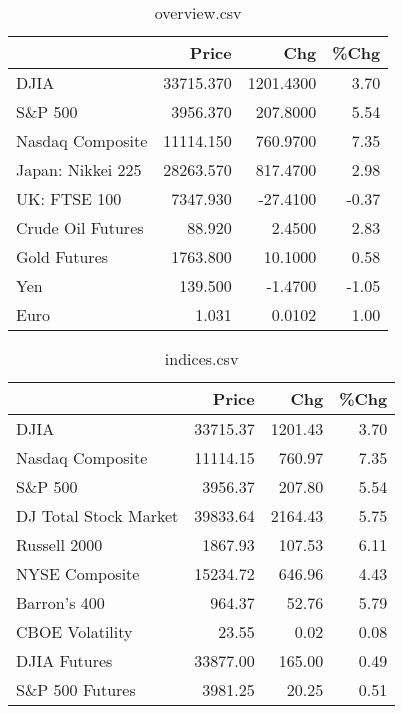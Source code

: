 \documentclass{article}%
\begin{document}
\begin{table}[htbp]%
\caption{overview.csv}%
\centering%
\begin{adjustbox}{width=1\textwidth}%
\begin{tabular}{lrrr}
\toprule
                  &     Price &       Chg &  \%Chg \\
\midrule
             DJIA & 33715.370 & 1201.4300 &  3.70 \\
          S\&P 500 &  3956.370 &  207.8000 &  5.54 \\
 Nasdaq Composite & 11114.150 &  760.9700 &  7.35 \\
Japan: Nikkei 225 & 28263.570 &  817.4700 &  2.98 \\
     UK: FTSE 100 &  7347.930 &  -27.4100 & -0.37 \\
Crude Oil Futures &    88.920 &    2.4500 &  2.83 \\
     Gold Futures &  1763.800 &   10.1000 &  0.58 \\
              Yen &   139.500 &   -1.4700 & -1.05 \\
             Euro &     1.031 &    0.0102 &  1.00 \\
\bottomrule
\end{tabular}
%
\end{adjustbox}%
\end{table}

%


\begin{table}[htbp]%
\caption{indices.csv}%
\centering%
\begin{adjustbox}{width=1\textwidth}%
\begin{tabular}{lrrr}
\toprule
                      &    Price &     Chg &  \%Chg \\
\midrule
                 DJIA & 33715.37 & 1201.43 &  3.70 \\
     Nasdaq Composite & 11114.15 &  760.97 &  7.35 \\
              S\&P 500 &  3956.37 &  207.80 &  5.54 \\
DJ Total Stock Market & 39833.64 & 2164.43 &  5.75 \\
         Russell 2000 &  1867.93 &  107.53 &  6.11 \\
       NYSE Composite & 15234.72 &  646.96 &  4.43 \\
         Barron's 400 &   964.37 &   52.76 &  5.79 \\
      CBOE Volatility &    23.55 &    0.02 &  0.08 \\
         DJIA Futures & 33877.00 &  165.00 &  0.49 \\
      S\&P 500 Futures &  3981.25 &   20.25 &  0.51 \\
\bottomrule
\end{tabular}
%
\end{adjustbox}%
\end{table}
\end{document}
